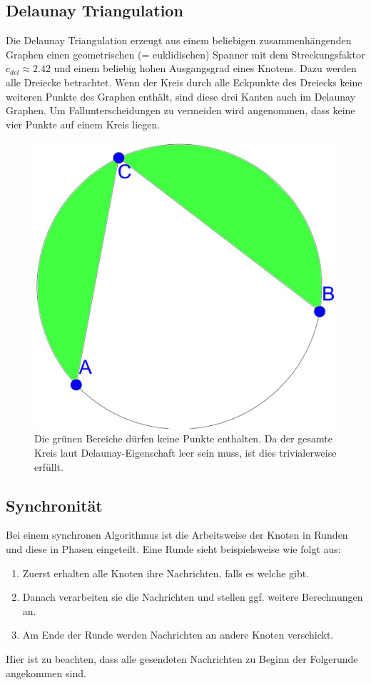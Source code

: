 \documentclass[a4paper,twoside]{IEEEtran}
\begin{document}
\subsection{Delaunay Triangulation}
Die Delaunay Triangulation erzeugt aus einem beliebigen zusammenhängenden Graphen einen geometrischen (= euklidischen) Spanner mit dem Streckungsfaktor $c_{del} \approx 2.42 $ und einem beliebig hohen Ausgangsgrad eines Knotens. 
Dazu werden alle Dreiecke betrachtet.
Wenn der Kreis durch alle Eckpunkte des Dreiecks keine weiteren Punkte des Graphen enthält, sind diese drei Kanten auch im Delaunay Graphen. 
Um Fallunterscheidungen zu vermeiden wird angenommen, dass keine vier Punkte auf einem Kreis liegen. 
\begin{figure}[h!]
\centering
\includegraphics[width=1\linewidth]{2-3.eps}
\caption{Die grünen Bereiche dürfen keine Punkte enthalten. Da der gesamte Kreis laut Delaunay-Eigenschaft leer sein muss, ist dies trivialerweise erfüllt.}
\label{fig:2-3}
\end{figure}


\subsection{Synchronität}
Bei einem synchronen Algorithmus ist die Arbeitsweise der Knoten in Runden und diese in Phasen eingeteilt. 
Eine Runde sieht beispielsweise wie folgt aus:
\begin{enumerate}
\item Zuerst erhalten alle Knoten ihre Nachrichten, falls es welche gibt.
\item Danach verarbeiten sie die Nachrichten und stellen ggf. weitere Berechnungen an.
\item Am Ende der Runde werden Nachrichten an andere Knoten verschickt.
\end{enumerate}
Hier ist zu beachten, dass alle gesendeten Nachrichten zu Beginn der Folgerunde angekommen sind.
\end{document}

